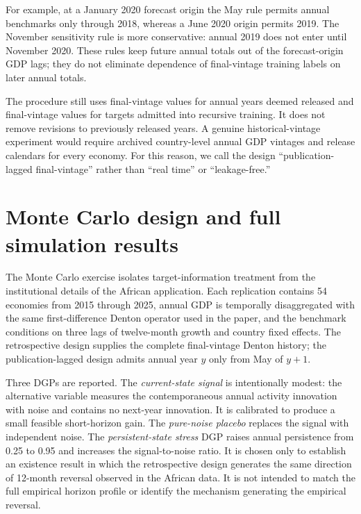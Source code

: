 \documentclass[12pt]{article}
\begin{document}
For example, at a January 2020 forecast origin the May rule permits annual benchmarks only through 2018, whereas a June 2020 origin permits 2019. The November sensitivity rule is more conservative: annual 2019 does not enter until November 2020. These rules keep future annual totals out of the forecast-origin GDP lags; they do not eliminate dependence of final-vintage training labels on later annual totals.

The procedure still uses final-vintage values for annual years deemed released and final-vintage values for targets admitted into recursive training. It does not remove revisions to previously released years. A genuine historical-vintage experiment would require archived country-level annual GDP vintages and release calendars for every economy. For this reason, we call the design ``publication-lagged final-vintage'' rather than ``real time'' or ``leakage-free.''



\section{Monte Carlo design and full simulation results}
The Monte Carlo exercise isolates target-information treatment from the institutional details of the African application. Each replication contains 54 economies from 2015 through 2025, annual GDP is temporally disaggregated with the same first-difference Denton operator used in the paper, and the benchmark conditions on three lags of twelve-month growth and country fixed effects. The retrospective design supplies the complete final-vintage Denton history; the publication-lagged design admits annual year $y$ only from May of $y+1$.

Three DGPs are reported. The \emph{current-state signal} is intentionally modest: the alternative variable measures the contemporaneous annual activity innovation with noise and contains no next-year innovation. It is calibrated to produce a small feasible short-horizon gain. The \emph{pure-noise placebo} replaces the signal with independent noise. The \emph{persistent-state stress} DGP raises annual persistence from 0.25 to 0.95 and increases the signal-to-noise ratio. It is chosen only to establish an existence result in which the retrospective design generates the same direction of 12-month reversal observed in the African data. It is not intended to match the full empirical horizon profile or identify the mechanism generating the empirical reversal.
\end{document}

